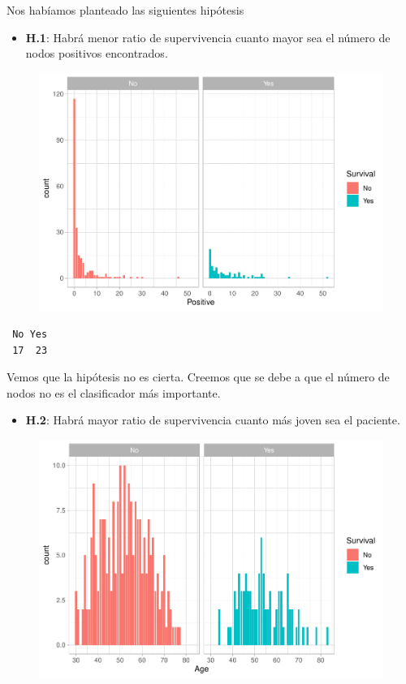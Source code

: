Nos habíamos planteado las siguientes hipótesis

\begin{itemize}
    \item \textbf{H.1}: Habrá menor ratio de supervivencia cuanto mayor sea el número de nodos positivos encontrados.
\end{itemize}

\begin{figure}[H]\includegraphics[width=.9\linewidth]{img/EDA2_files/figure-latex/unnamed-chunk-31-1} \caption{}\end{figure}

\begin{verbatim}
 No Yes 
 17  23 
\end{verbatim}

Vemos que la hipótesis no es cierta. Creemos que se debe a que el número de nodos no es el clasificador más importante.

\begin{itemize}
    \item \textbf{H.2}: Habrá mayor ratio de supervivencia cuanto más joven sea el paciente.
\end{itemize}

\begin{figure}[H]\includegraphics[width=.9\linewidth]{img/EDA2_files/figure-latex/unnamed-chunk-33-1} \caption{}\end{figure}

